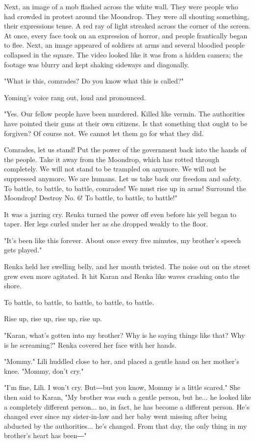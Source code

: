 Next, an image of a mob flashed across the white wall. They were people
who had crowded in protest around the Moondrop. They were all shouting
something, their expressions tense. A red ray of light streaked across
the corner of the screen. At once, every face took on an expression of
horror, and people frantically began to flee. Next, an image appeared of
soldiers at arms and several bloodied people collapsed in the square.
The video looked like it was from a hidden camera; the footage was
blurry and kept shaking sideways and diagonally.

"What is this, comrades? Do you know what this is called?"

Yoming's voice rang out, loud and pronounced.

"Yes. Our fellow people have been murdered. Killed like vermin. The
authorities have pointed their guns at their own citizens. Is that
something that ought to be forgiven? Of course not. We cannot let them
go for what they did.

Comrades, let us stand! Put the power of the government back into the
hands of the people. Take it away from the Moondrop, which has rotted
through completely. We will not stand to be trampled on anymore. We will
not be suppressed anymore. We are humans. Let us take back our freedom
and safety. To battle, to battle, to battle, comrades! We must rise up
in arms! Surround the Moondrop! Destroy No. 6! To battle, to battle, to
battle!"

It was a jarring cry. Renka turned the power off even before his yell
began to taper. Her legs curled under her as she dropped weakly to the
floor.

"It's been like this forever. About once every five minutes, my
brother's speech gets played."

Renka held her swelling belly, and her mouth twisted. The noise out on
the street grew even more agitated. It hit Karan and Renka like waves
crashing onto the shore.

To battle, to battle, to battle, to battle, to battle.

Rise up, rise up, rise up, rise up.

"Karan, what's gotten into my brother? Why is he saying things like
that? Why is he screaming?" Renka covered her face with her hands.

"Mommy." Lili huddled close to her, and placed a gentle hand on her
mother's knee. "Mommy, don't cry."

"I'm fine, Lili. I won't cry. But―but you know, Mommy is a little
scared." She then said to Karan, "My brother was such a gentle person,
but he... he looked like a completely different person... no, in fact,
he has become a different person. He's changed ever since my
sister-in-law and her baby went missing after being abducted by the
authorities... he's changed. From that day, the only thing in my
brother's heart has been―"

